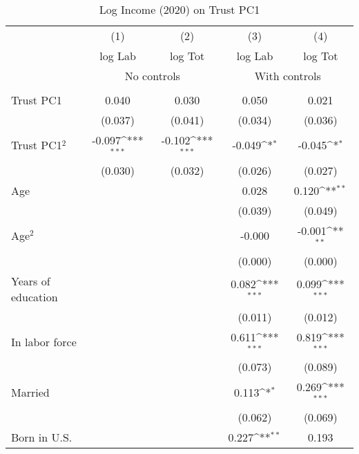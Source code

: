 \begin{table}[htbp]\centering
\def\sym#1{\ifmmode^{#1}\else\(^{#1}\)\fi}
\caption{Log Income (2020) on Trust PC1}
\begin{tabular}{l*{4}{c}}
\toprule
          &\multicolumn{1}{c}{(1)}&\multicolumn{1}{c}{(2)}&\multicolumn{1}{c}{(3)}&\multicolumn{1}{c}{(4)}\\
          &\multicolumn{1}{c}{log Lab}&\multicolumn{1}{c}{log Tot}&\multicolumn{1}{c}{log Lab}&\multicolumn{1}{c}{log Tot}\\
& \multicolumn{2}{c}{No controls} & \multicolumn{2}{c}{With controls} \\\\ \cmidrule(lr){2-3}\cmidrule(lr){4-5}
Trust PC1 &    0.040         &    0.030         &    0.050         &    0.021         \\
          &  (0.037)         &  (0.041)         &  (0.034)         &  (0.036)         \\
Trust PC1$^{2}$&   -0.097\sym{***}&   -0.102\sym{***}&   -0.049\sym{*}  &   -0.045\sym{*}  \\
          &  (0.030)         &  (0.032)         &  (0.026)         &  (0.027)         \\
Age       &                  &                  &    0.028         &    0.120\sym{**} \\
          &                  &                  &  (0.039)         &  (0.049)         \\
Age$^{2}$ &                  &                  &   -0.000         &   -0.001\sym{**} \\
          &                  &                  &  (0.000)         &  (0.000)         \\
Years of education&                  &                  &    0.082\sym{***}&    0.099\sym{***}\\
          &                  &                  &  (0.011)         &  (0.012)         \\
In labor force&                  &                  &    0.611\sym{***}&    0.819\sym{***}\\
          &                  &                  &  (0.073)         &  (0.089)         \\
Married   &                  &                  &    0.113\sym{*}  &    0.269\sym{***}\\
          &                  &                  &  (0.062)         &  (0.069)         \\
Born in U.S.&                  &                  &    0.227\sym{**} &    0.193         \\

\end{tabular}
\end{table}

